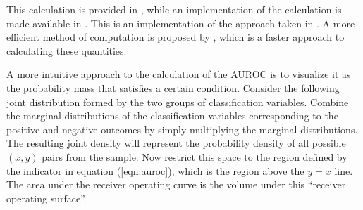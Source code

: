 %
%
%





This calculation is provided in \citet{hanleymcneil1982}, while an implementation of the calculation is made available in \citet{proc2011}.
This is an implementation of the approach taken in \citet{delong1988}.
%
A more efficient method of computation is proposed by \citet{sunxu2014}, which is a faster approach to calculating
these quantities.
%



A more intuitive approach to the calculation of the AUROC is to visualize it as the probability mass that satisfies a certain condition.
Consider the following joint distribution formed by the two groups of classification variables.
Combine the marginal distributions of the classification variables corresponding to the positive and negative outcomes by simply multiplying the marginal distributions.
The resulting joint density will represent the probability density of all possible $(x,y)$ pairs from the sample.
Now restrict this space to the region defined by the indicator in equation (\ref{eqn:auroc}), which is the region above the $y = x$ line.
The area under the receiver operating curve is the volume under this ``receiver operating surface''.

